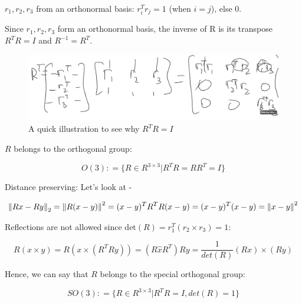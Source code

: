 $r_1, r_2, r_3$ from an orthonormal basis: $r_i^Tr_j = 1$ (when $i=j$), else $0$.

Since $r_1, r_2, r_3$ form an orthonormal basis, the inverse of R is its transpose $R^TR=I$ and $R^{-1} = R^T$.

\begin{figure}[h]\centering\includegraphics[width=12cm]{img/j_3_3.png}\caption{A quick illustration to see why $R^TR=I$}\end{figure}

$R$ belongs to the orthogonal group:

\begin{equation*}
    O(3): = \{ R\in R^{3\times 3} | R^TR = RR^T = I\}
\end{equation*}

Distance preserving: Let's look at -

\begin{equation*}
    \begin{split}
        \left\lVert Rx - Ry\right\rVert_2 = \left\lVert R(x - y)\right\rVert^2 = (x - y)^TR^TR(x - y) = (x - y)^T(x - y) = \left\lVert x - y\right\rVert^2
    \end{split}
\end{equation*}


Reflections are not allowed since $\text{det}(R) = r_1^T(r_2\times r_3) = 1$:

\begin{equation*}
    R(x\times y) = R(x\times (R^TRy)) = (R\hat{x}R^T)Ry = \frac{1}{det(R)}(Rx)\times (Ry)
\end{equation*}

Hence, we can say that $R$ belongs to the special orthogonal group:

\begin{equation*}
    SO(3) : = \{ R\in R^{3\times 3} | R^TR = I, det(R) = 1\}
\end{equation*}
